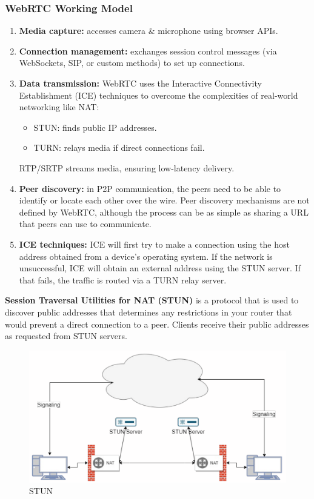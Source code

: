\documentclass[a4paper,11pt]{article}
\begin{document}
\subsubsection{WebRTC Working Model}
\begin{enumerate}
    \item   \textbf{Media capture:} accesses camera \& microphone using browser APIs.
    \item   \textbf{Connection management:} exchanges session control messages (via WebSockets, SIP, or custom methods) to set up connections.
    \item   \textbf{Data transmission:} WebRTC uses the Interactive Connectivity Establishment (ICE) techniques to overcome the complexities of real-world networking like NAT:
            \begin{itemize}
                \item   STUN: finds public IP addresses.
                \item   TURN: relays media if direct connections fail.
            \end{itemize}

        RTP/SRTP streams media, ensuring low-latency delivery.

    \item   \textbf{Peer discovery:} in P2P communication, the peers need to be able to identify or locate each other over the wire.
            Peer discovery mechanisms are not defined by WebRTC, although the process can be as simple as sharing a URL that peers can use to communicate.

    \item   \textbf{ICE techniques:} ICE will first try to make a connection using the host address obtained from a device's operating system.
            If the network is unsuccessful, ICE will obtain an external address using the STUN server.
            If that fails, the traffic is routed via a TURN relay server.
\end{enumerate}

\textbf{Session Traversal Utilities for NAT (STUN)} is a protocol that is used to discover public addresses that determines any restrictions in your router that would prevent a direct connection to a peer.
Clients receive their public addresses as requested from STUN servers.
\begin{figure}[H]
    \centering
    \includegraphics[width=\textwidth]{./images/stun.png}
    \caption{STUN}
\end{figure}
\end{document}
